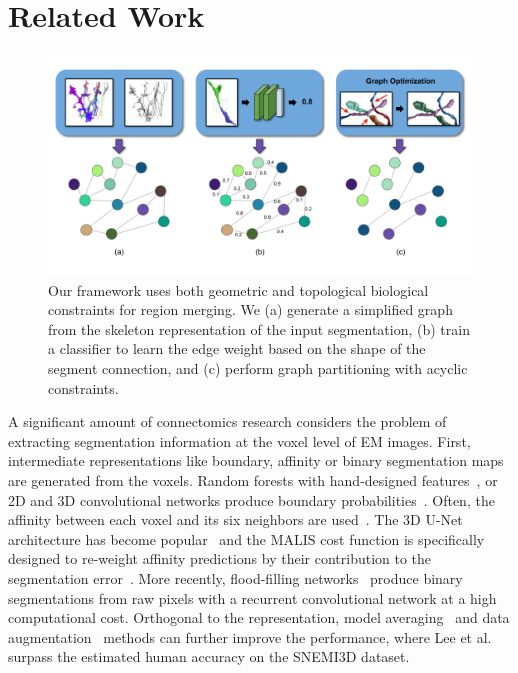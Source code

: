\section{Related Work}

\begin{figure}[t!]
	\centering
	\includegraphics[width=0.75\linewidth]{./figures/teaser_v4.png}
	\caption{Our framework uses both geometric and topological biological constraints for region merging. We (a) generate a simplified graph from the skeleton representation of the input segmentation, (b) train a classifier to learn the edge weight based on the shape of the segment connection, and (c) perform graph partitioning with acyclic constraints.}
	\label{fig:teaser_pipeline}
\end{figure}

A significant amount of connectomics research considers the problem of extracting segmentation information at the voxel level of EM images.
First, intermediate representations like boundary, affinity or binary segmentation maps are generated from the voxels.
Random forests with hand-designed features~\cite{kaynig2015large}, or 2D and 3D convolutional networks produce boundary probabilities~\cite{seymour2016rhoananet,ronneberger2015u,bogovic2013learned,ciresan2012deep,jain2010boundary,amelio_segmentation}.
Often, the affinity between each voxel and its six neighbors are used~\cite{lee2015recursive,parag2017anisotropic,lee2017superhuman,cciccek20163d,turaga2010convolutional}. 
The 3D U-Net architecture has become popular~\cite{cciccek20163d} and the MALIS cost function is specifically designed to re-weight affinity predictions by their contribution to the segmentation error~\cite{briggman2009maximin}.
More recently, flood-filling networks~\cite{januszewski2016flood} produce binary segmentations from raw pixels with a recurrent convolutional network at a high computational cost.
Orthogonal to the representation, model averaging~\cite{zeng2017deepem3d} and data augmentation~\cite{lee2017superhuman} methods can further improve the performance, where Lee et al.~\cite{lee2017superhuman} surpass the estimated human accuracy on the SNEMI3D dataset.


